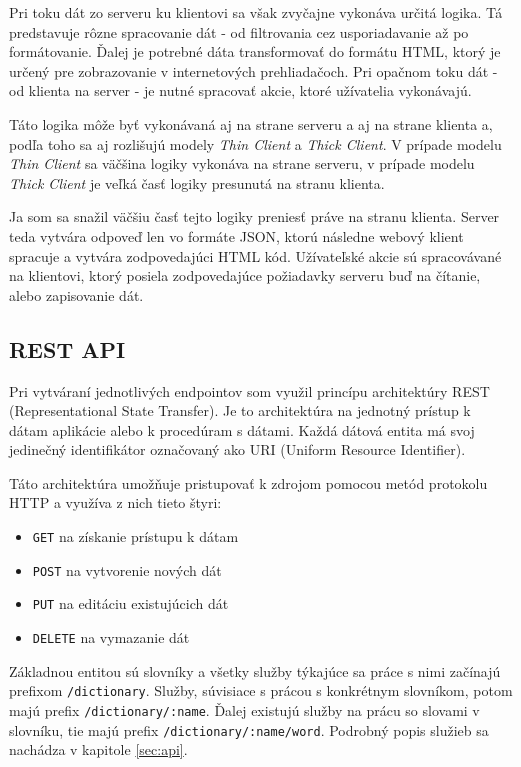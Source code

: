 \documentclass[
  digital, %
  table,   %
  lof,     %
  lot,     %
]{fithesis3}
\begin{document}
Pri toku dát zo serveru ku klientovi sa však zvyčajne vykonáva určitá logika. Tá predstavuje rôzne spracovanie dát - od filtrovania cez usporiadavanie až po formátovanie. Ďalej je potrebné dáta transformovať do formátu HTML, ktorý je určený pre zobrazovanie v internetových prehliadačoch. Pri opačnom toku dát - od klienta na server - je nutné spracovať akcie, ktoré užívatelia vykonávajú.

Táto logika môže byť vykonávaná aj na strane serveru a aj na strane klienta a, podľa toho sa aj rozlišujú modely \textit{Thin Client} a \textit{Thick Client}. V prípade modelu \textit{Thin Client} sa väčšina logiky vykonáva na strane serveru, v prípade modelu \textit{Thick Client} je veľká časť logiky presunutá na stranu klienta.

Ja som sa snažil väčšiu časť tejto logiky preniesť práve na stranu klienta. Server teda vytvára odpoveď len vo formáte JSON, ktorú následne webový klient spracuje a vytvára zodpovedajúci HTML kód. Užívateľské akcie sú spracovávané na klientovi, ktorý posiela zodpovedajúce požiadavky serveru buď na čítanie, alebo zapisovanie dát.

\subsection{REST API}
Pri vytváraní jednotlivých endpointov som využil princípu architektúry REST (Representational State Transfer). Je to architektúra na jednotný prístup k dátam aplikácie alebo k procedúram s dátami. Každá dátová entita má svoj jedinečný identifikátor označovaný ako URI (Uniform Resource Identifier).

Táto architektúra umožňuje pristupovať k zdrojom pomocou metód protokolu HTTP a využíva z nich tieto štyri:
\begin{itemize}
	\item \texttt{GET} na získanie prístupu k dátam
	\item \texttt{POST} na vytvorenie nových dát
	\item \texttt{PUT} na editáciu existujúcich dát
    \item \texttt{DELETE} na vymazanie dát
\end{itemize}

Základnou entitou sú slovníky a všetky služby týkajúce sa práce s nimi začínajú prefixom \texttt{/dictionary}. Služby, súvisiace s prácou s konkrétnym slovníkom, potom majú prefix \texttt{/dictionary/:name}. Ďalej existujú služby na prácu so slovami v slovníku, tie majú prefix \texttt{/dictionary/:name/word}. Podrobný popis služieb sa nachádza v kapitole \ref{sec:api}.
\end{document}
